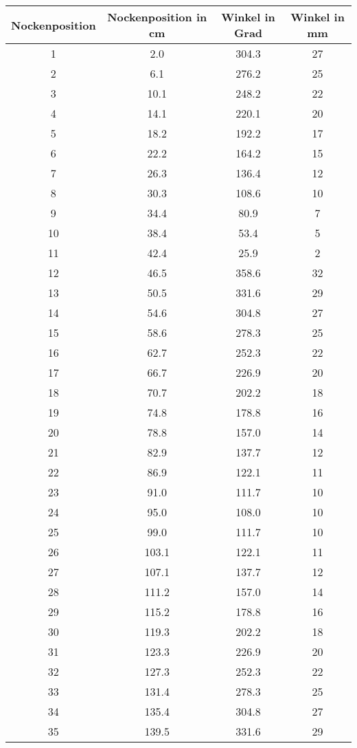 \documentclass[10pt, a4paper]{article}
\begin{document}
\begin{center}
	\begin{tabular}{c|c|c|c}
		Nockenposition & Nockenposition in cm & Winkel in Grad & Winkel in mm \\
		\hline
		1 & 2.0 & 304.3 & 27 \\
		2 & 6.1 & 276.2 & 25 \\
		3 & 10.1 & 248.2 & 22 \\
		4 & 14.1 & 220.1 & 20 \\
		5 & 18.2 & 192.2 & 17 \\
		6 & 22.2 & 164.2 & 15 \\
		7 & 26.3 & 136.4 & 12 \\
		8 & 30.3 & 108.6 & 10 \\
		9 & 34.4 & 80.9 & 7 \\
		10 & 38.4 & 53.4 & 5 \\
		11 & 42.4 & 25.9 & 2 \\
		12 & 46.5 & 358.6 & 32 \\
		13 & 50.5 & 331.6 & 29 \\
		14 & 54.6 & 304.8 & 27 \\
		15 & 58.6 & 278.3 & 25 \\
		16 & 62.7 & 252.3 & 22 \\
		17 & 66.7 & 226.9 & 20 \\
		18 & 70.7 & 202.2 & 18 \\
		19 & 74.8 & 178.8 & 16 \\
		20 & 78.8 & 157.0 & 14 \\
		21 & 82.9 & 137.7 & 12 \\
		22 & 86.9 & 122.1 & 11 \\
		23 & 91.0 & 111.7 & 10 \\
		24 & 95.0 & 108.0 & 10 \\
		25 & 99.0 & 111.7 & 10 \\
		26 & 103.1 & 122.1 & 11 \\
		27 & 107.1 & 137.7 & 12 \\
		28 & 111.2 & 157.0 & 14 \\
		29 & 115.2 & 178.8 & 16 \\
		30 & 119.3 & 202.2 & 18 \\
		31 & 123.3 & 226.9 & 20 \\
		32 & 127.3 & 252.3 & 22 \\
		33 & 131.4 & 278.3 & 25 \\
		34 & 135.4 & 304.8 & 27 \\
		35 & 139.5 & 331.6 & 29 \\

\end{tabular}
\end{center}
\end{document}
